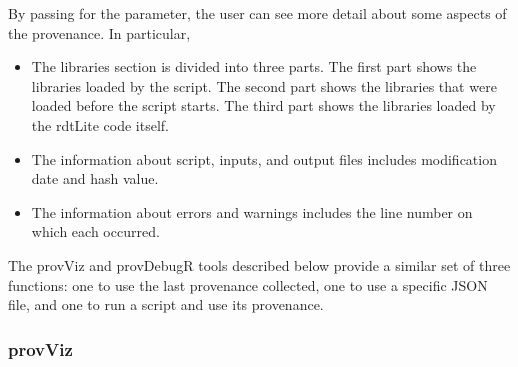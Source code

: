 By passing  for the  parameter, the user can see more detail about some aspects of the provenance.  In particular, 
\begin{itemize}
    \item The libraries section is divided into three parts.  The first part shows the libraries loaded by the script.  The second part shows the libraries that were loaded before the script starts.  The third part shows the libraries loaded by the rdtLite code itself.  
    \item The information about script, inputs, and output files includes modification date and hash value.
    \item The information about errors and warnings includes the line number on which each occurred.
\end{itemize}

%



The provViz and provDebugR tools described below provide a similar set of three functions: one to use the last provenance collected, one to use a specific JSON file, and one to run a script and use its provenance.

\subsubsection{provViz}

